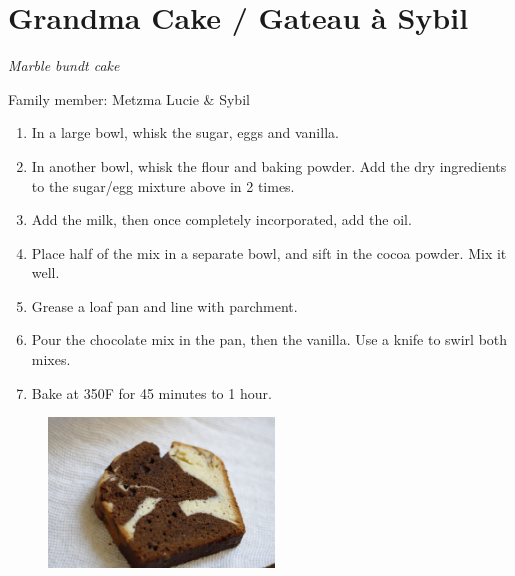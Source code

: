 \chapter{Grandma Cake / Gateau à Sybil}
\label{ch:grandma_cake}


\textit{Marble bundt cake}

Family member: Metzma Lucie \& Sybil

\begin{enumerate}
    \item In a large bowl, whisk the sugar, eggs and vanilla.
    \item In another bowl, whisk the flour and baking powder. Add the dry ingredients to the sugar/egg mixture above in 2 times.
    \item Add the milk, then once completely incorporated, add the oil.
    \item Place half of the mix in a separate bowl, and sift in the cocoa powder. Mix it well.
    \item Grease a loaf pan and line with parchment. 
    \item Pour the chocolate mix in the pan, then the vanilla. Use a knife to swirl both mixes.
    \item Bake at 350\degree F for 45 minutes to 1 hour.
\end{enumerate}

\begin{figure}
  \includegraphics[width=60mm]{dermardiros/images/Grandma cake 1.JPG}
\end{figure}


